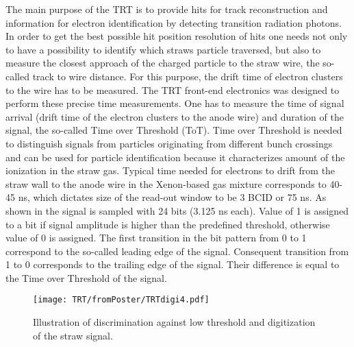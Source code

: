 The main purpose of the TRT is to provide hits for track reconstruction and information for electron identification by detecting transition radiation photons.
In order to get the best possible hit position resolution of hits one needs not only to have a possibility to identify which straws particle traversed,
but also to measure the closest approach of the charged particle to the straw wire, the so-called track to wire distance. 
For this purpose, the drift time of electron clusters to the wire has to be measured.
The TRT front-end electronics was designed to perform these precise time measurements.
One has to measure the time of signal arrival (drift time of the electron clusters to the anode wire) and duration of the signal, the so-called Time over Threshold (ToT).
Time over Threshold is needed to distinguish signals from particles originating from different bunch crossings 
and can be used for particle identification because it characterizes amount of the ionization in the straw gas.
Typical time needed for electrons to drift from the straw wall to the anode wire in the Xenon-based gas mixture corresponds to 40-45 ns, which dictates size of the read-out window to be 
3 BCID or 75 ns. As shown in  the signal is sampled with 24 bits (3.125 ns each). 
Value of 1 is assigned to a bit if signal amplitude is higher than the predefined threshold, 
otherwise value of 0 is assigned. The first transition in the bit pattern from 0 to 1 correspond to the so-called leading edge of the signal. Consequent transition from 1 to 0 
corresponds to the trailing edge of the signal. Their difference is equal to the Time over Threshold of the signal. 

\begin{figure}
\begin{center}
 \texttt{[image: TRT/fromPoster/TRTdigi4.pdf]}
\caption{Illustration of discrimination against low threshold and digitization of the straw signal.}
\label{fig:pulseDigitization}
\end{center}
\end{figure}


